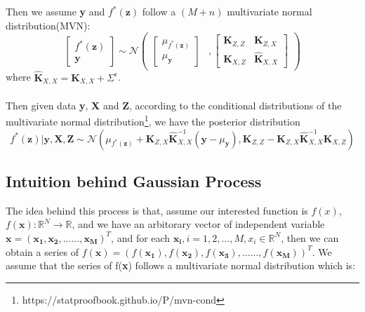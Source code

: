 Then we assume \textbf{y} and $f^{*}(\boldsymbol{z})$ follow a $(M + n)$ multivariate normal distribution(MVN): \\
\begin{equation}
\begin{bmatrix}
f^{*}(\boldsymbol{z}) \\
\boldsymbol{y} 
\end{bmatrix} \sim \mathcal{N}
\begin{pmatrix}
\begin{bmatrix}
\mu_{f^{*}(\boldsymbol{z})} \\ \mu_{\boldsymbol{y}}
\end{bmatrix} 
 & ,\begin{bmatrix}
\boldsymbol{K}_{Z, Z} & \boldsymbol{K}_{Z, X} \\
\boldsymbol{K}_{X, Z} & \hat{\boldsymbol{K}}_{X, X}
\end{bmatrix}
\end{pmatrix}
\end{equation}
where $ \hat{\boldsymbol{K}}_{X, X} = \boldsymbol{K}_{X, X} + \varSigma^{\epsilon}$. \\ \\
Then given data \textbf{y}, \textbf{X} and \textbf{Z}, according to the conditional distributions of the multivariate normal distribution\footnote{https://statproofbook.github.io/P/mvn-cond}, we have the posterior distribution 
\begin{equation}
 f^{*}(\boldsymbol{z}) | \boldsymbol{y}, \boldsymbol{X},  \boldsymbol{Z} \sim  \mathcal{N}(\mu_{f^{*}(\boldsymbol{z})} + \boldsymbol{K}_{Z, X}\hat{\boldsymbol{K}}_{X, X}^{-1}(\boldsymbol{y} - \mu_{\boldsymbol{y}}), \boldsymbol{K}_{Z, Z} - \boldsymbol{K}_{Z, X}\hat{\boldsymbol{K}}_{X, X}^{-1}\boldsymbol{K}_{X, Z})
\end{equation}

\subsection{Intuition behind Gaussian Process}
The idea behind this process is that, assume our interested function is $f(x)$, $ f(\boldsymbol{x}): \mathbb{R}^N \to \mathbb{R}$, and we have an arbitorary vector of independent variable $\boldsymbol{x} = (\boldsymbol{x_1}, \boldsymbol{x_2,} ......, \boldsymbol{x_M})^T$, and for each $\boldsymbol{x_i}, i = 1, 2, ...,M, x_i \in \mathbb{R}^N$, then we can obtain a series of $f(\boldsymbol{x})= (f(\boldsymbol{x_1}), f(\boldsymbol{x_2}), f(\boldsymbol{x_3}), ......, f(\boldsymbol{x_M}) )^T$. We assume that the series of f(\textbf{x}) follows a multivariate normal distribution which is: 

